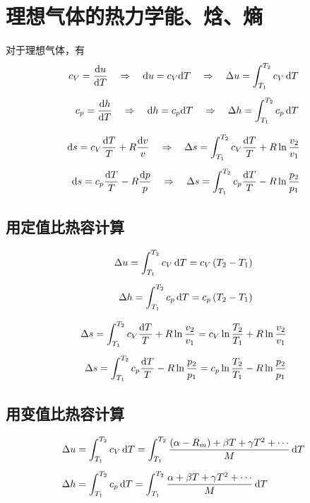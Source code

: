 \section{理想气体的热力学能、焓、熵}

对于理想气体，有
\begin{align*}
	c_V = \dfrac{{\rm{d}} u}{{\rm{d}} T} \quad \Rightarrow \quad 
	{\rm{d}} u = c_V {\rm{d}} T \quad \Rightarrow \quad 
	\Delta u = \int_{T_1}^{T_2} c_V\, {\rm{d}} T\\[0.5em]
	c_p = \dfrac{{\rm{d}} h}{{\rm{d}} T} \quad \Rightarrow \quad 
	{\rm{d}} h = c_p {\rm{d}} T \quad \Rightarrow \quad 
	\Delta h = \int_{T_1}^{T_2} c_p\, {\rm{d}} T
\end{align*}
\vspace*{-3em}

\begin{align*}
	{\rm{d}} s= c_V \dfrac{{\rm{d}} T}{T} + R \dfrac{{\rm{d}} v}{v} \quad \Rightarrow \quad 
	\Delta s = \int_{T_1}^{T_2} c_V \dfrac{{\rm{d}} T}{T} + R \ln\dfrac{v_2}{v_1}\\[0.5em]
	{\rm{d}} s= c_p \dfrac{{\rm{d}} T}{T} - R \dfrac{{\rm{d}} p}{p} \quad \Rightarrow \quad 
	\Delta s = \int_{T_1}^{T_2} c_p \dfrac{{\rm{d}} T}{T} - R \ln\dfrac{p_2}{p_1}
\end{align*}
\vspace*{2em}

\subsection{用定值比热容计算}
\vspace*{-3em}
\begin{align}
	\Delta u = \int_{T_1}^{T_2} c_V\, {\rm{d}} T = c_V\left(T_2 - T_1\right)\\[0.5em]
	\Delta h = \int_{T_1}^{T_2} c_p\, {\rm{d}} T = c_p \left(T_2 - T_1\right)
\end{align}
\vspace*{-3em}

\begin{align}
	\Delta s = \int_{T_1}^{T_2} c_V \dfrac{{\rm{d}} T}{T} + R \ln\dfrac{v_2}{v_1} = c_V\ln \dfrac{T_2}{T_1} + R \ln \dfrac{v_2}{v_1}\\[0.5em]
	\Delta s = \int_{T_1}^{T_2} c_p \dfrac{{\rm{d}} T}{T} - R \ln\dfrac{p_2}{p_1} = c_p\ln \dfrac{T_2}{T_1} - R \ln \dfrac{p_2}{p_1}
\end{align}
\vspace*{2em}

\subsection{用变值比热容计算}
\vspace*{-3em}
\begin{align}
	&\Delta u = \int_{T_1}^{T_2} c_V \, {\rm{d}} T = \int_{T_1}^{T_2} \dfrac{\left(\alpha - R_m\right) + \beta T + \gamma T^2 + \cdots}{M}\, {\rm{d}} T\\[0.5em]
	&\Delta h = \int_{T_1}^{T_2} c_p \, {\rm{d}} T = \int_{T_1}^{T_2} \dfrac{\alpha + \beta T + \gamma T^2 + \cdots}{M} \, {\rm{d}} T 
\end{align}
\vspace*{-3em}

